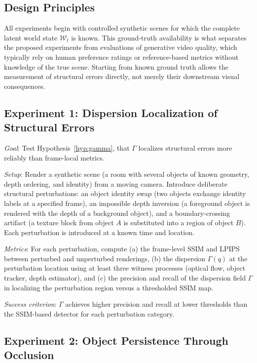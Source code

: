\documentclass[12pt,a4paper]{article}
\theoremstyle{plain}
\theoremstyle{definition}
\theoremstyle{remark}
\begin{document}
\subsection{Design Principles}

All experiments begin with controlled synthetic scenes for which the complete latent world state $\mathcal{W}_t$ is known. This ground-truth availability is what separates the proposed experiments from evaluations of generative video quality, which typically rely on human preference ratings or reference-based metrics without knowledge of the true scene. Starting from known ground truth allows the measurement of structural errors directly, not merely their downstream visual consequences.

\subsection{Experiment 1: Dispersion Localization of Structural Errors}

\textit{Goal}: Test Hypothesis~\ref{hyp:gamma}, that $\Gamma$ localizes structural errors more reliably than frame-local metrics.

\textit{Setup}: Render a synthetic scene (a room with several objects of known geometry, depth ordering, and identity) from a moving camera. Introduce deliberate structural perturbations: an object identity swap (two objects exchange identity labels at a specified frame), an impossible depth inversion (a foreground object is rendered with the depth of a background object), and a boundary-crossing artifact (a texture block from object $A$ is substituted into a region of object $B$). Each perturbation is introduced at a known time and location.

\textit{Metrics}: For each perturbation, compute (a) the frame-level SSIM and LPIPS between perturbed and unperturbed renderings, (b) the dispersion $\Gamma(q)$ at the perturbation location using at least three witness processes (optical flow, object tracker, depth estimator), and (c) the precision and recall of the dispersion field $\Gamma$ in localizing the perturbation region versus a thresholded SSIM map.

\textit{Success criterion}: $\Gamma$ achieves higher precision and recall at lower thresholds than the SSIM-based detector for each perturbation category.

\subsection{Experiment 2: Object Persistence Through Occlusion}
\end{document}
